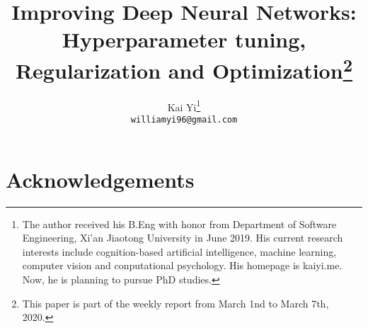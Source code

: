 \documentclass{article}
\title{Improving Deep Neural Networks: Hyperparameter tuning, Regularization and Optimization\thanks{This paper is part of the weekly report from March 1nd to March 7th, 2020.}}
\author{
    Kai Yi\thanks{The author received his B.Eng with honor from Department of Software Engineering, Xi'an Jiaotong University in June 2019. His current research interests include cognition-based artificial intelligence, machine learning, computer vision and conputational psychology. His homepage is kaiyi.me. Now, he is planning to pursue PhD studies.}\\
  \texttt{williamyi96@gmail.com} \\}
\begin{document}
\maketitle

\begin{abstract}
\lipsum[1]
\end{abstract}  






% 

% 
  
\section*{Acknowledgements}
  


\end{document}
